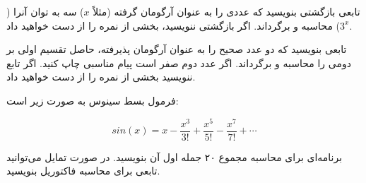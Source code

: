 \documentclass[12pt]{exam}
\begin{document}
\begin{questions}

\question[20]
تابعی بازگشتی بنویسید که عددی را به عنوان آرگومان گرفته (مثلاً $x$) سه به توان آنرا ($3^x$) محاسبه و برگرداند. اگر بازگشتی ننویسید، بخشی از نمره را از دست خواهید داد.

\question[20]
تابعی بنویسید که دو عدد صحیح را به عنوان آرگومان پذیرفته، حاصل تقسیم اولی بر دومی را محاسبه و برگرداند. اگر عدد دوم صفر است پیام مناسبی چاپ کنید. اگر تابع ننویسید بخشی از نمره را از دست خواهید داد.

\question[30]
فرمول بسط سینوس به صورت زیر است:

\[ sin(x) = x - \frac{x^3}{3!} + \frac{x^5}{5!} - \frac{x^7}{7!} +  \cdots \]

برنامه‌ای برای محاسبه  مجموع ۲۰ جمله اول آن بنویسید.
در صورت تمایل می‌توانید تابعی برای محاسبه فاکتوریل بنویسید.

\end{questions}
\end{document}
